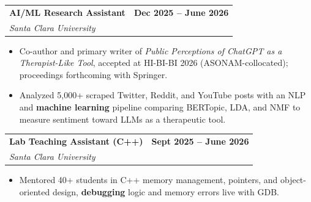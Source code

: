 \documentclass[letterpaper,10pt]{article}
\makeatletter
\newcommand{\nk}{\kern0pt}
\newcommand{\resumeItem}[1]{
  \item\small{
    {#1 \vspace{-3pt}}
  }
}
\newcommand{\resumeSubheading}[4]{
  \vspace{-2pt}\item
    \begin{tabular*}{0.97\textwidth}[t]{l@{\extracolsep{\fill}}r}
      \textbf{#1} & \textbf{#2} \\   %
      \textit{\small#3} & \textit{\small #4} \\
    \end{tabular*}\vspace{-7pt}
}
\newcommand{\resumeItemListStart}{\begin{itemize}}
\newcommand{\resumeItemListEnd}{\end{itemize}\vspace{-7pt}}
\makeatother
\begin{document}
    \resumeSubheading
      {AI/ML Research Assistant}{Dec 2025 -- June 2026}
      {Santa Clara University}{}
      \resumeItemListStart
        \resumeItem{Co-author and primary writer of \emph{Public Perceptions of ChatGPT as a Therapist-Like Tool}, accepted at HI-\nk BI-\nk BI 2026 (ASONAM-collocated); proceedings forthcoming with Springer.}
        \resumeItem{Analyzed 5,000+ scraped Twitter, Reddit, and YouTube posts with an NLP and \textbf{machine learning} pipeline comparing BERTopic, LDA, and NMF to measure sentiment toward LLMs as a therapeutic tool.}
      \resumeItemListEnd

    \resumeSubheading
      {Lab Teaching Assistant (C++)}{Sept 2025 -- June 2026}
      {Santa Clara University}{}
      \resumeItemListStart
        \resumeItem{Mentored 40+ students in C++ memory management, pointers, and object-oriented design, \textbf{debugging} logic and memory errors live with GDB.}
      \resumeItemListEnd
\end{document}
